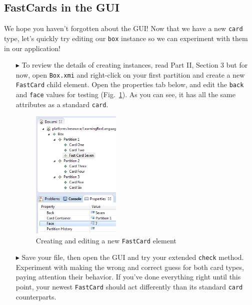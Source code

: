 \newpage
\hypertarget{subsec:fastGUI}{}
\subsection{FastCards in the GUI}
\genHeader

We hope you haven't forgotten about the GUI! Now that we have a new \texttt{card} type, let's quickly try editing our \texttt{box} instance so we can experiment
with them in our application!

\begin{itemize}
  
\item[$\blacktriangleright$] To review the details of creating instances, read Part II, Section 3 but for now, open \texttt{Box.xmi} and right-click on your
first partition and create a new \texttt{FastCard} child element. Open the properties tab below, and edit the \texttt{back} and \texttt{face} values for
testing (Fig.~\ref{fig:fastCardProperties}). As you can see, it has all the same attributes as a standard \texttt{card}.

\vspace{0.5cm}

\begin{figure}[htbp]
\begin{center}
  \includegraphics[width=0.4\textwidth]{eclipse_fastCardProperties}
  \caption{Creating and editing a new \texttt{FastCard} element}  
  \label{fig:fastCardProperties}
\end{center}
\end{figure}

\item[$\blacktriangleright$] Save your file, then open the GUI and try your extended \texttt{check} method. Experiment with making the wrong and correct
guess for both card types, paying attention their behavior. If you've done everything right until this point, your newest \texttt{FastCard} should act
differently than its standard \texttt{card} counterparts.

\end{itemize}
